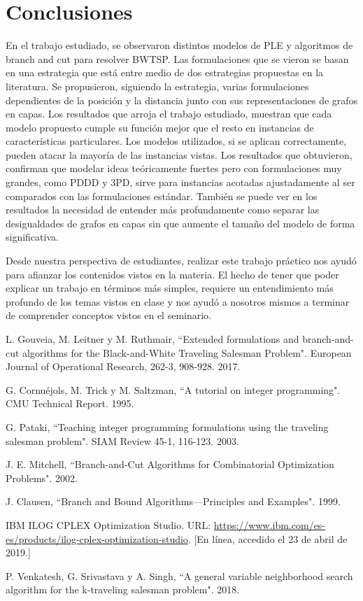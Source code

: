 \documentclass[10pt, a4paper]{article}
\theoremstyle{definition}
\begin{document}
\section{Conclusiones}

En el trabajo estudiado, se observaron distintos modelos de PLE y algoritmos de branch and cut para resolver BWTSP.
Las formulaciones que se vieron se basan en una estrategia que está entre medio de dos estrategias propuestas en la literatura.
Se propusieron, siguiendo la estrategia, varias formulaciones dependientes de la posición y la distancia junto con sus representaciones de grafos en capas.
Los resultados que arroja el trabajo estudiado, muestran que cada modelo propuesto cumple su función mejor que el resto en instancias de características particulares.
Los modelos utilizados, si se aplican correctamente, pueden atacar la mayoría de las instancias vistas.
Los resultados que obtuvieron, confirman que modelar ideas teóricamente fuertes pero con formulaciones muy grandes, como PDDD y 3PD, sirve para instancias acotadas ajustadamente al ser comparados con las formulaciones estándar.
También se puede ver en los resultados la necesidad de entender más profundamente como separar las desigualdades de grafos en capas sin que aumente el tamaño del modelo de forma significativa.

Desde nuestra perspectiva de estudiantes, realizar este trabajo práctico nos ayudó para afianzar los contenidos vistos en la materia. El hecho de tener que poder explicar un trabajo en términos más simples,
requiere un entendimiento más profundo de los temas vistos en clase y nos ayudó a nosotros mismos a terminar de comprender conceptos vistos en el seminario.

\pagebreak

\begin{thebibliography}{9}

L. Gouveia, M. Leitner y M. Ruthmair, “Extended formulations and branch-and-cut algorithms for the Black-and-White Traveling Salesman Problem". European Journal of Operational Research, 262-3, 908-928. 2017.

G. Cornuéjols, M. Trick y M. Saltzman, “A tutorial on integer programming". CMU Technical Report. 1995.

G. Pataki, “Teaching integer programming formulations using the traveling salesman problem". SIAM Review 45-1, 116-123. 2003.

J. E. Mitchell, “Branch-and-Cut Algorithms for Combinatorial Optimization Problems". 2002.

J. Clausen, “Branch and Bound Algorithms—Principles and Examples". 1999.

IBM ILOG CPLEX Optimization Studio. URL: \url{https://www.ibm.com/es-es/products/ilog-cplex-optimization-studio}. [En línea, accedido el 23 de abril de 2019.]

P. Venkatesh, G. Srivastava y A. Singh, “A general variable neighborhood search algorithm for the k-traveling salesman problem". 2018.

\end{thebibliography}
\end{document}
